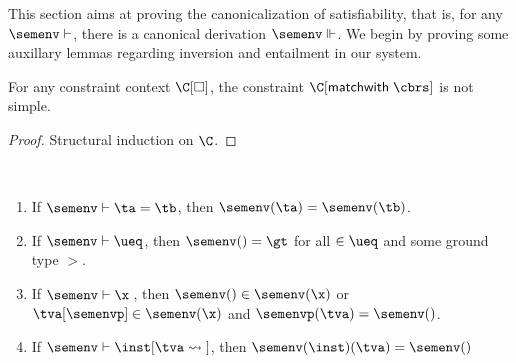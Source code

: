 \documentclass[acmsmall,screen,nonacm,review]{acmart}
\begin{document}
This section aims at proving the canonicalization of satisfiability, that is,
for any $\semenv \th \c$, there is a canonical derivation $\semenv \Th \c$.
%
We begin by proving some auxillary lemmas regarding inversion and
entailment in our system.

\begin{lemma}
  \label{lem:match-is-not-simple}
  For any constraint context $\C\where{\square}$,
  the constraint $\C\where{\cmatch \t \cbrs}$ is not simple.
  \begin{proof}
    Structural induction on $\C$.
  \end{proof}
\end{lemma}


\begin{lemma}~
  \label{lem:simple-inversion}
  \begin{enumerate}[(\roman*)]
    \item If $\semenv \th \cunif \ta \tb$, then $\semenv(\ta) = \semenv(\tb)$.
    \item If $\semenv \th \ueq$, then $\semenv(\t) = \gt$ for all $\t \in \ueq$ and some ground type $\gt$.
    \item If $\semenv \th \capp \x \t$, then $\semenv(\t) \in \semenv(\x)$ or $\greg \tv \semenvp \in \semenv(\x)$ and $\semenvp(\tv) = \semenv(\t)$.
    \item If $\semenv \th \cpinst \inst \tv \t$, then $\semenv(\inst)(\tv) = \semenv(\t)$


\end{enumerate}
\end{lemma}
\end{document}
